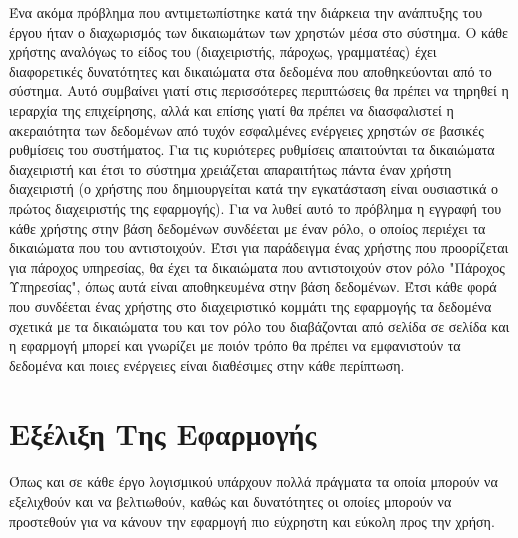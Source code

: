 Ένα ακόμα πρόβλημα που αντιμετωπίστηκε κατά την διάρκεια την ανάπτυξης του έργου ήταν ο διαχωρισμός των δικαιωμάτων των χρηστών μέσα στο σύστημα. Ο κάθε χρήστης αναλόγως το είδος του (διαχειριστής, πάροχως, γραμματέας) έχει διαφορετικές δυνατότητες και δικαιώματα στα δεδομένα που αποθηκεύονται από το σύστημα. Αυτό συμβαίνει γιατί στις περισσότερες περιπτώσεις θα πρέπει να τηρηθεί η ιεραρχία της επιχείρησης, αλλά και επίσης γιατί θα πρέπει να διασφαλιστεί η ακεραιότητα των δεδομένων από τυχόν εσφαλμένες ενέργειες χρηστών σε βασικές ρυθμίσεις του συστήματος. Για τις κυριότερες ρυθμίσεις απαιτούνται τα δικαιώματα διαχειριστή και έτσι το σύστημα χρειάζεται απαραιτήτως πάντα έναν χρήστη διαχειριστή (ο χρήστης που δημιουργείται κατά την εγκατάσταση είναι ουσιαστικά ο πρώτος διαχειριστής της εφαρμογής). Για να λυθεί αυτό το πρόβλημα η εγγραφή του κάθε χρήστης στην βάση δεδομένων συνδέεται με έναν ρόλο, ο οποίος περιέχει τα δικαιώματα που του αντιστοιχούν. Έτσι για παράδειγμα ένας χρήστης που προορίζεται για πάροχος υπηρεσίας, θα έχει τα δικαιώματα που αντιστοιχούν στον ρόλο "Πάροχος Υπηρεσίας", όπως αυτά είναι αποθηκευμένα στην βάση δεδομένων. Έτσι κάθε φορά που συνδέεται ένας χρήστης στο διαχειριστικό κομμάτι της εφαρμογής τα δεδομένα σχετικά με τα δικαιώματα του και τον ρόλο του διαβάζονται από σελίδα σε σελίδα και η εφαρμογή μπορεί και γνωρίζει με ποιόν τρόπο θα πρέπει να εμφανιστούν τα δεδομένα και ποιες ενέργειες είναι διαθέσιμες στην κάθε περίπτωση.

\section{Εξέλιξη Της Εφαρμογής}
Όπως και σε κάθε έργο λογισμικού υπάρχουν πολλά πράγματα τα οποία μπορούν να εξελιχθούν και να βελτιωθούν, καθώς και δυνατότητες οι οποίες μπορούν να προστεθούν για να κάνουν την εφαρμογή πιο εύχρηστη και εύκολη προς την χρήση.